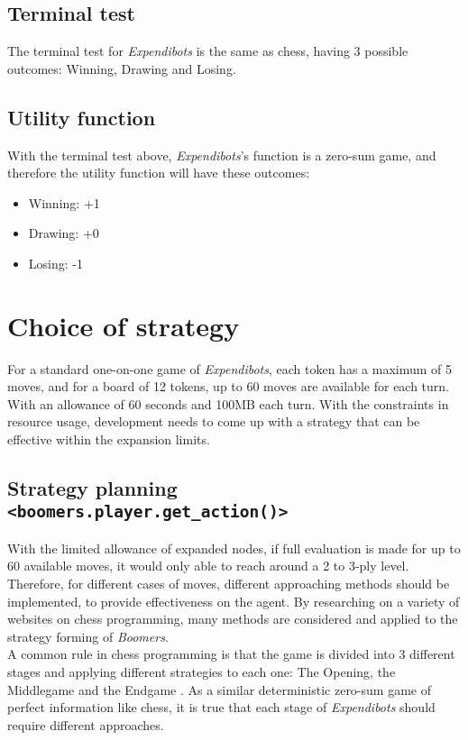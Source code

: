 \documentclass[]{article}
\newcommand{\gameName}{Expendibots}
\begin{document}
\subsection{Terminal test}

The terminal test for \emph{\gameName} is the same as chess, having 3 possible outcomes: Winning, Drawing and Losing.

\subsection{Utility function}

With the terminal test above, \emph{\gameName}'s function is a zero-sum game, and therefore the utility function will have these outcomes:

\begin{itemize}
    \item Winning: +1
    \item Drawing: +0
    \item Losing: -1
\end{itemize}

\section{Choice of strategy}

For a standard one-on-one game of \emph{\gameName}, each token has a maximum of 5 moves, and for a board of 12 tokens, up to 60 moves are available for each turn. With an allowance of 60 seconds and 100MB each turn. With the constraints in resource usage, development needs to come up with a strategy that can be effective within the expansion limits.

\subsection{Strategy planning \texttt{<boomers.player.get\_action()>}}

With the limited allowance of expanded nodes, if full evaluation is made for up to 60 available moves, it would only able to reach around a 2 to 3-ply level. Therefore, for different cases of moves, different approaching methods should be implemented, to provide effectiveness on the agent. By researching on a variety of websites on chess programming, many methods are considered and applied to the strategy forming of \emph{Boomers}. \\

A common rule in chess programming is that the game is divided into 3 different stages and applying different strategies to each one: The Opening, the Middlegame and the Endgame \cite{phase}. As a similar deterministic zero-sum game of perfect information like chess, it is true that each stage of \emph{\gameName} should require different approaches.
\end{document}
